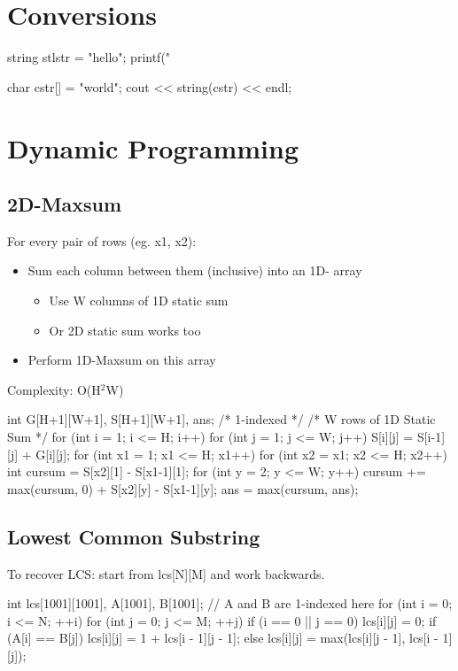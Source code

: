 \documentclass{article}
\begin{document}
\section{Conversions}
\begin{mylisting}{}
string stlstr = "hello";
printf("%

char cstr[] = "world";
cout << string(cstr) << endl;
\end{mylisting}

\section{Dynamic Programming}
\subsection{2D-Maxsum}
For every pair of rows (eg. x1, x2):
\begin{itemize}
  \item Sum each column between them (inclusive) into an 1D-
array
    \begin{itemize}
        \item Use W columns of 1D static sum
        \item Or 2D static sum works too
    \end{itemize}

  \item Perform 1D-Maxsum on this array
\end{itemize}
Complexity: O(H$^2$W)

\begin{mylisting}{}
int G[H+1][W+1], S[H+1][W+1], ans; /* 1-indexed */
/* W rows of 1D Static Sum */
for (int i = 1; i <= H; i++) 
    for (int j = 1; j <= W; j++) 
        S[i][j] = S[i-1][j] + G[i][j];
for (int x1 = 1; x1 <= H; x1++) {
    for (int x2 = x1; x2 <= H; x2++) {
        int cursum = S[x2][1] - S[x1-1][1];
        for (int y = 2; y <= W; y++) {
            cursum += max(cursum, 0) + S[x2][y] - S[x1-1][y];
            ans = max(cursum, ans);
        }
    }
}
\end{mylisting}

\subsection{Lowest Common Substring}
To recover LCS: start from lcs[N][M] and work backwards.
\begin{mylisting}{}
int lcs[1001][1001], A[1001], B[1001]; // A and B are 1-indexed here
for (int i = 0; i <= N; ++i) {
	for (int j = 0; j <= M; ++j) {
		if (i == 0 || j == 0) lcs[i][j] = 0;
		if (A[i] == B[j]) lcs[i][j] = 1 + lcs[i - 1][j - 1];
		else lcs[i][j] = max(lcs[i][j - 1], lcs[i - 1][j]);
	}
}
\end{mylisting}
\end{document}
